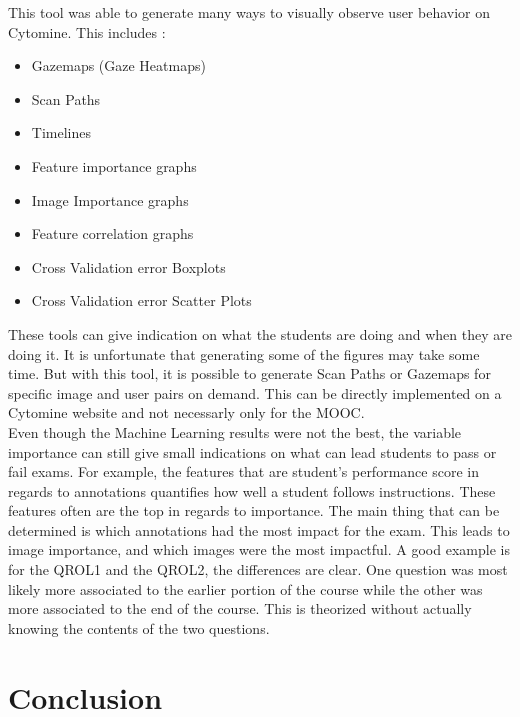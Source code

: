 \documentclass[a4paper,11pt]{report}
\numberwithin{figure}{section} %
\begin{document}
        This tool was able to generate many ways to visually observe user behavior on Cytomine. This includes :
        \begin{itemize}
            \item[\textbullet] Gazemaps (Gaze Heatmaps)
            \item[\textbullet] Scan Paths
            \item[\textbullet] Timelines
            \item[\textbullet] Feature importance graphs
            \item[\textbullet] Image Importance graphs
            \item[\textbullet] Feature correlation graphs
            \item[\textbullet] Cross Validation error Boxplots
            \item[\textbullet] Cross Validation error Scatter Plots
        \end{itemize}

        These tools can give indication on what the students are doing and when they are doing it.
        It is unfortunate that generating some of the figures may take some time.
        But with this tool, it is possible to generate Scan Paths or Gazemaps for specific image and user pairs on demand.
        This can be directly implemented on a Cytomine website and not necessarly only for the MOOC.\\


        Even though the Machine Learning results were not the best, the variable importance can still give small indications on what can lead students to pass or fail exams.
        For example, the features that are student's performance score in regards to annotations quantifies how well a student follows instructions.
        These features often are the top in regards to importance.
        The main thing that can be determined is which annotations had the most impact for the exam.
        This leads to image importance, and which images were the most impactful.
        A good example is for the QROL1 and the QROL2, the differences are clear.
        One question was most likely more associated to the earlier portion of the course while the other was more associated to the end of the course.
        This is theorized without actually knowing the contents of the two questions.



\chapter{Conclusion}
\end{document}
